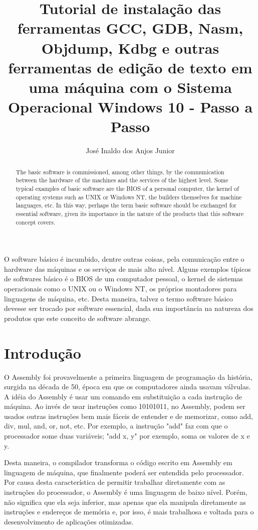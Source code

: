 \documentclass[12pt]{article}
\title{Tutorial de instalação das ferramentas GCC, GDB, Nasm, Objdump, Kdbg e outras ferramentas de edição de texto em uma máquina com o Sistema Operacional Windows 10 - Passo a Passo}
\author{José Inaldo dos Anjos Junior\inst{1}}
\begin{document}
 

\maketitle

\begin{abstract}
  The basic software is commissioned, among other things, by the communication between the hardware of the machines and the services of the highest level. Some typical examples of basic software are the BIOS of a personal computer, the kernel of operating systems such as UNIX or Windows NT, the builders themselves for machine languages, etc. In this way, perhaps the term basic software should be exchanged for essential software, given its importance in the nature of the products that this software concept covers.
\end{abstract}
     
\begin{resumo} 
  O software básico é incumbido, dentre outras coisas, pela comunicação entre o hardware das máquinas e os serviços de mais alto nível. Alguns exemplos típicos de softwares básico é o BIOS de um computador pessoal, o kernel de sistemas operacionais como o UNIX ou o Windows NT, os próprios montadores para linguagens de máquina, etc. Desta maneira, talvez o termo software básico devesse ser trocado por software essencial, dada sua importância na natureza dos produtos que este conceito de software abrange.
\end{resumo}


\section{Introdução}

O Assembly foi provavelmente a primeira linguagem de programação da história, surgida na década de 50, época em que os computadores ainda usavam válvulas. A idéia do Assembly é usar um comando em substituição a cada instrução de máquina. Ao invés de usar instruções como 10101011, no Assembly, podem ser usados outras instruções bem mais fáceis de entender e de memorizar, como add, div, mul, and, or, not, etc. Por exemplo, a instrução "add" faz com que o processador some duas variáveis; "add x, y" por exemplo, soma os valores de x e y.

Desta maneira, o compilador transforma o código escrito em Assembly em linguagem de máquina, que finalmente poderá ser entendida pelo processador. Por causa desta característica de permitir trabalhar diretamente com as instruções do processador, o Assembly é uma linguagem de baixo nível. Porém, não significa que ela seja inferior, mas apenas que ela manipula diretamente as instruções e endereços de memória e, por isso, é mais trabalhosa e voltada para o desenvolvimento de aplicações otimizadas.
\end{document}
